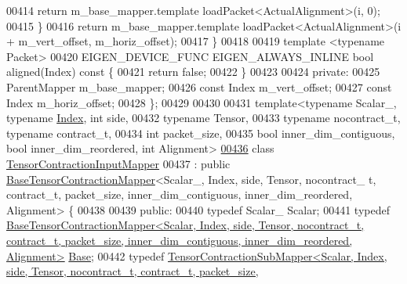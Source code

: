 \begin{DoxyCode}
00414      \textcolor{keywordflow}{return} m\_base\_mapper.template loadPacket<ActualAlignment>(i, 0);
00415     \}
00416     \textcolor{keywordflow}{return} m\_base\_mapper.template loadPacket<ActualAlignment>(i + m\_vert\_offset, m\_horiz\_offset);
00417   \}
00418 
00419   \textcolor{keyword}{template} <\textcolor{keyword}{typename} Packet>
00420   EIGEN\_DEVICE\_FUNC EIGEN\_ALWAYS\_INLINE \textcolor{keywordtype}{bool} aligned(Index)\textcolor{keyword}{ const }\{
00421     \textcolor{keywordflow}{return} \textcolor{keyword}{false};
00422   \}
00423 
00424  \textcolor{keyword}{private}:
00425   ParentMapper m\_base\_mapper;
00426   \textcolor{keyword}{const} Index m\_vert\_offset;
00427   \textcolor{keyword}{const} Index m\_horiz\_offset;
00428 \};
00429 
00430 
00431 \textcolor{keyword}{template}<\textcolor{keyword}{typename} Scalar\_, \textcolor{keyword}{typename} \hyperlink{namespace_eigen_a62e77e0933482dafde8fe197d9a2cfde}{Index}, \textcolor{keywordtype}{int} side,
00432          \textcolor{keyword}{typename} Tensor,
00433          \textcolor{keyword}{typename} nocontract\_t, \textcolor{keyword}{typename} contract\_t,
00434          \textcolor{keywordtype}{int} packet\_size,
00435          \textcolor{keywordtype}{bool} inner\_dim\_contiguous, \textcolor{keywordtype}{bool} inner\_dim\_reordered, \textcolor{keywordtype}{int} Alignment>
\hyperlink{class_eigen_1_1internal_1_1_tensor_contraction_input_mapper}{00436} \textcolor{keyword}{class }\hyperlink{class_eigen_1_1internal_1_1_tensor_contraction_input_mapper}{TensorContractionInputMapper}
00437   : \textcolor{keyword}{public} \hyperlink{class_eigen_1_1internal_1_1_base_tensor_contraction_mapper}{BaseTensorContractionMapper}<Scalar\_, Index, side, Tensor, nocontract\_
      t, contract\_t, packet\_size, inner\_dim\_contiguous, inner\_dim\_reordered, Alignment> \{
00438 
00439  \textcolor{keyword}{public}:
00440   \textcolor{keyword}{typedef} Scalar\_ Scalar;
00441   \textcolor{keyword}{typedef} 
      \hyperlink{class_eigen_1_1internal_1_1_base_tensor_contraction_mapper}{BaseTensorContractionMapper<Scalar, Index, side, Tensor, nocontract\_t, contract\_t, packet\_size,
       inner\_dim\_contiguous, inner\_dim\_reordered, Alignment>}
       \hyperlink{class_eigen_1_1internal_1_1_base_tensor_contraction_mapper}{Base};
00442   \textcolor{keyword}{typedef} 
      \hyperlink{class_eigen_1_1internal_1_1_tensor_contraction_sub_mapper}{TensorContractionSubMapper<Scalar, Index, side, Tensor, nocontract\_t, contract\_t, packet\_size,
}
\end{DoxyCode}
